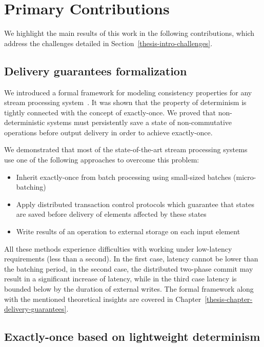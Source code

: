 \section{Primary Contributions}
\label{thesis-intro-contributions}

We highlight the main results of this work in the following contributions, which address the challenges detailed in Section~\ref{thesis-intro-challenges}.

\subsection{Delivery guarantees formalization}

We introduced a formal framework for modeling consistency properties for any stream processing system~\cite{thepaper}. It was shown that the property of determinism is tightly connected with the concept of exactly-once. We proved that non-deterministic systems must persistently save a state of non-commutative operations before output delivery in order to achieve exactly-once.

We demonstrated that most of the state-of-the-art stream processing systems~\cite{Carbone:2017:SMA:3137765.3137777, Zaharia:2012:DSE:2342763.2342773, Akidau:2013:MFS:2536222.2536229, apache:storm:trident} use one of the following approaches to overcome this problem: 

\begin{itemize}
    \item Inherit exactly-once from batch processing using small-sized batches (micro-batching)
    \item Apply distributed transaction control protocols which guarantee that states are saved before delivery of elements affected by these states
    \item Write results of an operation to external storage on each input element
\end{itemize}

All these methods experience difficulties with working under low-latency requirements (less than a second). In the first case, latency cannot be lower than the batching period, in the second case, the distributed two-phase commit may result in a significant increase of latency, while in the third case latency is bounded below by the duration of external writes. The formal framework along with the mentioned theoretical insights are covered in Chapter~\ref{thesis-chapter-delivery-guarantees}.

\subsection{Exactly-once based on lightweight determinism}

